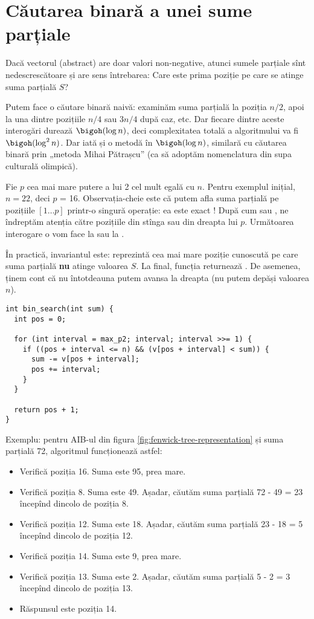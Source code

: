 \section{Căutarea binară a unei sume parțiale}

Dacă vectorul (abstract) are doar valori non-negative, atunci sumele parțiale sînt nedescrescătoare și are sens întrebarea: Care este prima poziție pe care se atinge suma parțială $S$?

Putem face o căutare binară naivă: examinăm suma parțială la poziția $n/2$, apoi la una dintre pozițiile $n/4$ sau $3n/4$ după caz, etc. Dar fiecare dintre aceste interogări durează $\bigoh(\log n)$, deci complexitatea totală a algoritmului va fi $\bigoh(\log^2 n)$. Dar iată și o metodă în $\bigoh(\log n)$, similară cu căutarea binară prin „metoda Mihai Pătrașcu” (ca să adoptăm nomenclatura din supa culturală olimpică).

Fie $p$ cea mai mare putere a lui 2 cel mult egală cu $n$. Pentru exemplul inițial, $n = 22$, deci $p$ = 16. Observația-cheie este că putem afla suma parțială pe pozițiile $[1 \dots p]$ printr-o singură operație: ea este exact ! După cum  sau , ne îndreptăm atenția către pozițiile din stînga sau din dreapta lui $p$. Următoarea interogare o vom face la  sau la .

În practică, invariantul este:  reprezintă cea mai mare poziție cunoscută pe care suma parțială \textbf{nu} atinge valoarea $S$. La final, funcția returnează . De asemenea, ținem cont că nu întotdeauna putem avansa la dreapta (nu putem depăși valoarea $n$).

\begin{verbatim}
int bin_search(int sum) {
  int pos = 0;

  for (int interval = max_p2; interval; interval >>= 1) {
    if ((pos + interval <= n) && (v[pos + interval] < sum)) {
      sum -= v[pos + interval];
      pos += interval;
    }
  }

  return pos + 1;
}
\end{verbatim}

Exemplu: pentru AIB-ul din figura \ref{fig:fenwick-tree-representation} și suma parțială 72, algoritmul funcționează astfel:

\begin{itemize}
  \item Verifică poziția 16. Suma este 95, prea mare.
  \item Verifică poziția 8. Suma este 49. Așadar, căutăm suma parțială 72 - 49 = 23 începînd dincolo de poziția 8.
  \item Verifică poziția 12. Suma este 18. Așadar, căutăm suma parțială 23 - 18 = 5 începînd dincolo de poziția 12.
  \item Verifică poziția 14. Suma este 9, prea mare.
  \item Verifică poziția 13. Suma este 2. Așadar, căutăm suma parțială 5 - 2 = 3 începînd dincolo de poziția 13.
  \item Răspunsul este poziția 14.
\end{itemize}

